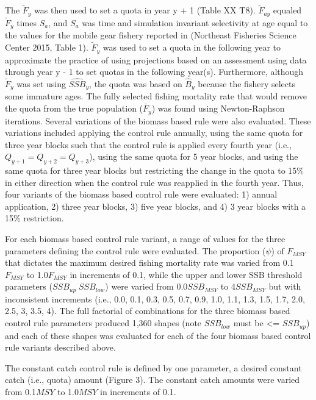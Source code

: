 \documentclass[]{article}
\begin{document}
The \(\tilde{F}_y\) was then used to set a quota in year y + 1 (Table XX
T8). \(\tilde{F}_{ay}\) equaled \(\tilde{F}_y\) times \(S_a\), and
\(S_a\) was time and simulation invariant selectivity at age equal to
the values for the mobile gear fishery reported in (Northeast Fisheries
Science Center 2015, Table 1). \(\tilde{F}_y\) was used to set a quota
in the following year to approximate the practice of using projections
based on an assessment using data through year y - 1 to set quotas in
the following year(s). Furthermore, although \(\tilde{F}_y\) was set
using \(\widehat{SSB}_y\), the quota was based on \(\widehat{B}_y\)
because the fishery selects some immature ages. The fully selected
fishing mortality rate that would remove the quota from the true
population (\(\bar{F}_y\)) was found using Newton-Raphson iterations.
Several variations of the biomass based rule were also evaluated. These
variations included applying the control rule annually, using the same
quota for three year blocks such that the control rule is applied every
fourth year (i.e., \(Q_{y+1}=Q_{y+2}=Q_{y+3}\)), using the same quota
for 5 year blocks, and using the same quota for three year blocks but
restricting the change in the quota to 15\% in either direction when the
control rule was reapplied in the fourth year. Thus, four variants of
the biomass based control rule were evaluated: 1) annual application, 2)
three year blocks, 3) five year blocks, and 4) 3 year blocks with a 15\%
restriction.

For each biomass based control rule variant, a range of values for the
three parameters defining the control rule were evaluated. The
proportion (\(\psi\)) of \(F_{MSY}\) that dictates the maximum desired
fishing mortality rate was varied from 0.1\(F_{MSY}\) to 1.0\(F_{MSY}\)
in increments of 0.1, while the upper and lower SSB threshold parameters
(\(SSB_{up} \; SSB_{low}\)) were varied from 0.0\(SSB_{MSY}\) to
4\(SSB_{MSY}\) but with inconsistent increments (i.e., 0.0, 0.1, 0.3,
0.5, 0.7, 0.9, 1.0, 1.1, 1.3, 1.5, 1.7, 2.0, 2.5, 3, 3.5, 4). The full
factorial of combinations for the three biomass based control rule
parameters produced 1,360 shapes (note \(SSB_{low}\) must be
\textless{}= \(SSB_{up}\)) and each of these shapes was evaluated for
each of the four biomass based control rule variants described above.

The constant catch control rule is defined by one parameter, a desired
constant catch (i.e., quota) amount (Figure 3). The constant catch
amounts were varied from 0.1\(MSY\) to 1.0\(MSY\) in increments of 0.1.
\end{document}
